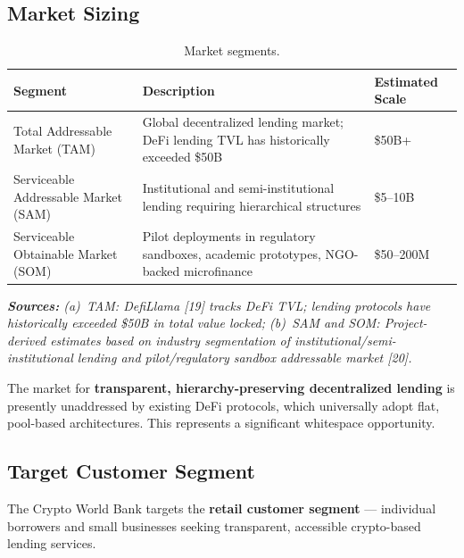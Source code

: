 \documentclass[11pt,a4paper]{article}
\newcommand{\tableheadfont}{\bfseries\small\color{PrimaryBlue}}
\newenvironment{moderntable}[1][H]{%
    \begin{table}[#1]\centering\small%
    \renewcommand{\arraystretch}{1.35}%
}{%
    \end{table}%
}
\begin{document}
\subsection{Market Sizing}

\begin{moderntable}
\caption{Market segments.}
\begin{tabular}{@{} >{\raggedright}p{4cm} >{\raggedright}p{5cm} >{\raggedright\arraybackslash}p{3cm} @{}}
\toprule
\tableheadfont Segment & \tableheadfont Description & \tableheadfont Estimated Scale \\
\midrule
\rowcolor{RowShade}
Total Addressable Market (TAM) & Global decentralized lending market; DeFi lending TVL has historically exceeded \$50B & \$50B+ \\
Serviceable Addressable Market (SAM) & Institutional and semi-institutional lending requiring hierarchical structures & \$5--10B \\
\rowcolor{RowShade}
Serviceable Obtainable Market (SOM) & Pilot deployments in regulatory sandboxes, academic prototypes, NGO-backed microfinance & \$50--200M \\
\bottomrule
\end{tabular}
\end{moderntable}

\vspace{4pt}
\noindent\textit{\small\textbf{Sources:} (a)~TAM: DefiLlama [19] tracks DeFi TVL; lending protocols have historically exceeded \$50B in total value locked; (b)~SAM and SOM: Project-derived estimates based on industry segmentation of institutional/semi-institutional lending and pilot/regulatory sandbox addressable market [20].}

The market for \textbf{transparent, hierarchy-preserving decentralized lending} is presently unaddressed by existing DeFi protocols, which universally adopt flat, pool-based architectures. This represents a significant whitespace opportunity.

\subsection{Target Customer Segment}

The Crypto World Bank targets the \textbf{retail customer segment} --- individual borrowers and small businesses seeking transparent, accessible crypto-based lending services.
\end{document}
